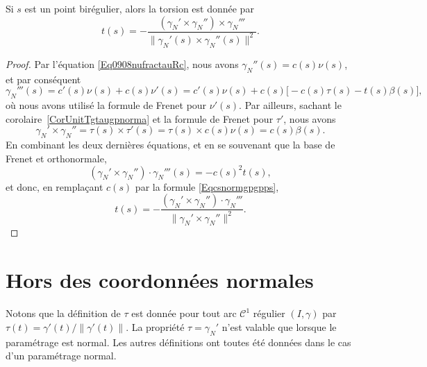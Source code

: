 \begin{proposition}
	Si \( s\) est un point birégulier, alors la torsion est donnée par
	\begin{equation}
		t(s)=-\frac{ (\gamma_N'\times \gamma_N'')\times \gamma_N''' }{ \| \gamma_N'(s)\times \gamma_N''(s) \|^2 }.
	\end{equation}
\end{proposition}

\begin{proof}
	Par l'équation \eqref{Eq0908nufractauRc}, nous avons \( \gamma_N''(s)=c(s)\nu(s)\), et par conséquent
	\begin{equation}
		\gamma_N'''(s)=c'(s)\nu(s)+c(s)\nu'(s)=c'(s)\nu(s)+c(s)\big[ -c(s)\tau(s)-t(s)\beta(s) \big],
	\end{equation}
	où nous avons utilisé la formule de Frenet pour \( \nu'(s)\). Par ailleurs, sachant le corolaire~\ref{CorUnitTgtaugpnorma} et la formule de Frenet pour \( \tau'\), nous avons
	\begin{equation}
		\gamma_N'\times \gamma_N''=\tau(s)\times \tau'(s)=\tau(s)\times c(s)\nu(s)=c(s)\beta(s).
	\end{equation}
	En combinant les deux dernières équations, et en se souvenant que la base de Frenet et orthonormale,
	\begin{equation}
		(\gamma_N'\times \gamma_N'')\cdot \gamma_N'''(s)=-c(s)^2t(s),
	\end{equation}
	et donc, en remplaçant \( c(s)\) par la formule \eqref{Eqcsnormgpgpps},
	\begin{equation}
		t(s)=-\frac{  (\gamma_N'\times \gamma_N'')\cdot \gamma_N'''   }{ \| \gamma_N'\times \gamma_N'' \|^2 }.
	\end{equation}
\end{proof}

\section{Hors des coordonnées normales}

\begin{remark}      \label{Remfougnormoupad}
	Notons que la définition de \( \tau\) est donnée pour tout arc \( \mathcal{C}^1\) régulier \( (I,\gamma)\) par \( \tau(t)=\gamma'(t)/\| \gamma'(t) \|\). La propriété \( \tau=\gamma_N'\) n'est valable que lorsque le paramétrage est normal. Les autres définitions ont toutes été données dans le cas d'un paramétrage normal.
\end{remark}

